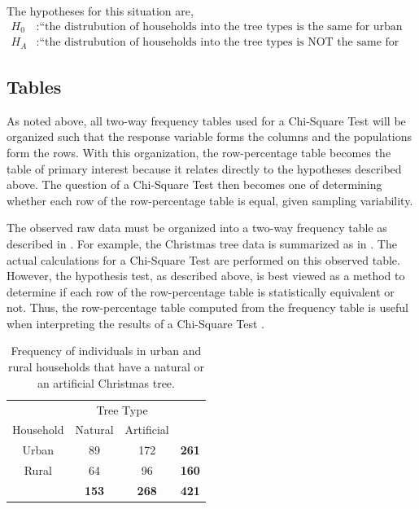 \documentclass[10pt,openany]{book}\usepackage[]{graphicx}\usepackage[]{color}
\begin{document}
The hypotheses for this situation are,
\[ \begin{split}
  H_{0}&: \text{``the distrubution of households into the tree types is the same for urban and rural households''} \\
  H_{A}&: \text{``the distrubution of households into the tree types is NOT the same for urban and rural households''}
\end{split} \]


\subsection{Tables}
As noted above, all two-way frequency tables used for a Chi-Square Test will be organized such that the response variable forms the columns and the populations form the rows. With this organization, the row-percentage table becomes the table of primary interest because it relates directly to the hypotheses described above. The question of a Chi-Square Test then becomes one of determining whether each row of the row-percentage table is equal, given sampling variability.

The observed raw data must be organized into a two-way frequency table as described in . For example, the Christmas tree data is summarized as in . The actual calculations for a Chi-Square Test are performed on this observed table. However, the hypothesis test, as described above, is best viewed as a method to determine if each row of the row-percentage table is statistically equivalent or not. Thus, the row-percentage table computed from the frequency table is useful when interpreting the results of a Chi-Square Test .

\begin{table}[htbp]
  \centering
  \caption{Frequency of individuals in urban and rural households that have a natural or an artificial Christmas tree.}\label{tab:ChiTreeObs}
    \begin{tabular}{c|c|c|c|}
      \multicolumn{1}{c}{} & \multicolumn{2}{c}{Tree Type} & \multicolumn{1}{c}{} \\
      \cline{2-3}
      Household & Natural & Artificial & \multicolumn{1}{c}{} \\
      \hline
      \multicolumn{1}{|c|}{Urban} & 89 & 172 & \textbf{261} \\
      \hline
      \multicolumn{1}{|c|}{Rural} & 64 & 96 & \textbf{160} \\
      \hline
       & \textbf{153} & \textbf{268} & \textbf{421} \\
      \cline{2-4}
    \end{tabular}
\end{table}
\end{document}
